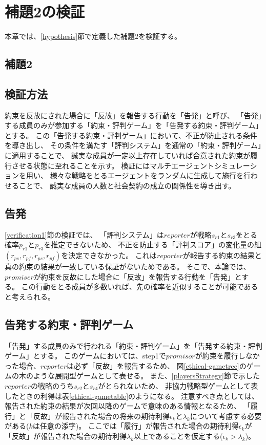 \chapter{補題2の検証}
本章では、\ref{hypothesis}節で定義した補題2を検証する。

\section{補題2}
\secondLemma

\section{検証方法}
約束を反故にされた場合に「反故」を報告する行動を「告発」と呼び、
「告発」する成員のみが参加する「約束・評判ゲーム」を「告発する約束・評判ゲーム」とする。
この「告発する約束・評判ゲーム」において、不正が防止される条件を導き出し、
その条件を満たす「評判システム」を通常の「約束・評判ゲーム」に適用することで、
誠実な成員が一定以上存在していれば合意された約束が履行させる状態に至れることを示す。
検証にはマルチエージェントシミュレーションを用い、
様々な戦略をとるエージェントをランダムに生成して施行を行わせることで、
誠実な成員の人数と社会契約の成立の関係性を導き出す。


\section{告発}
\ref{verification1}節の検証では、
「評判システム」は$reporter$が戦略$s_{r1}$と$s_{r3}$をとる確率$p_{r1}$と$p_{r3}$を推定できないため、
不正を防止する「評判スコア」の変化量の組$(r_{ps}, r_{pf}, r_{ps}, r_{pf})$を決定できなかった。
これは$reporter$が報告する約束の結果と真の約束の結果が一致している保証がないためである。
そこで、本論では、$promiser$が約束を反故にした場合に「反故」を報告する行動を「告発」とする。
この行動をとる成員が多数いれば、先の確率を近似することが可能であると考えられる。


\section{告発する約束・評判ゲーム}
「告発」する成員のみで行われる「約束・評判ゲーム」を「告発する約束・評判ゲーム」とする。
このゲームにおいては、step1で$promisor$が約束を履行しなかった場合、$reporter$は必ず「反故」を報告するため、
図\ref{ethical-gametree}のゲームの木のような展開型ゲームとして表せる。
また、\ref{playersStrategy}節で示した$reporter$の戦略のうち$s_{r2}$と$s_{r4}$がとられないため、
非協力戦略型ゲームとして表したときの利得は表\ref{ethical-gametable}のようになる。
注意すべき点としては、報告された約束の結果が次回以降のゲームで意味のある情報となるため、
「履行」と「反故」が報告された場合の将来の期待利得$\epsilon_k$と$\lambda_k$について考慮する必要がある($k$は任意の添字)。
ここでは「履行」が報告された場合の期待利得$\epsilon_k$が「反故」が報告された場合の期待利得$\lambda_k$以上であることを仮定する($\epsilon_k > \lambda_k$)。

